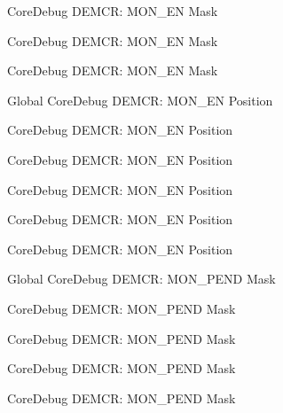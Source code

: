 \begin{DoxyRefList}
\label{deprecated__deprecated000505}%
%
Core\+Debug DEMCR\+: MON\+\_\+\+EN Mask 

\label{deprecated__deprecated000340}%
%
Core\+Debug DEMCR\+: MON\+\_\+\+EN Mask 

\label{deprecated__deprecated000198}%
%
Core\+Debug DEMCR\+: MON\+\_\+\+EN Mask  
\item[Global \doxylink{group___c_m_s_i_s___core_debug_ga802829678f6871863ae9ecf60a10425c}{Core\+Debug\+\_\+\+DEMCR\+\_\+\+MON\+\_\+\+EN\+\_\+\+Pos} ]\label{deprecated__deprecated000053}%
%
Core\+Debug DEMCR\+: MON\+\_\+\+EN Position 

\label{deprecated__deprecated000415}%
%
Core\+Debug DEMCR\+: MON\+\_\+\+EN Position 

\label{deprecated__deprecated000504}%
%
Core\+Debug DEMCR\+: MON\+\_\+\+EN Position 

\label{deprecated__deprecated000606}%
%
Core\+Debug DEMCR\+: MON\+\_\+\+EN Position 

\label{deprecated__deprecated000339}%
%
Core\+Debug DEMCR\+: MON\+\_\+\+EN Position 

\label{deprecated__deprecated000197}%
%
Core\+Debug DEMCR\+: MON\+\_\+\+EN Position  
\item[Global \doxylink{group___c_m_s_i_s___core_debug_ga68ec55930269fab78e733dcfa32392f8}{Core\+Debug\+\_\+\+DEMCR\+\_\+\+MON\+\_\+\+PEND\+\_\+\+Msk} ]\label{deprecated__deprecated000052}%
%
Core\+Debug DEMCR\+: MON\+\_\+\+PEND Mask 

\label{deprecated__deprecated000503}%
%
Core\+Debug DEMCR\+: MON\+\_\+\+PEND Mask 

\label{deprecated__deprecated000605}%
%
Core\+Debug DEMCR\+: MON\+\_\+\+PEND Mask 

\label{deprecated__deprecated000338}%
%
Core\+Debug DEMCR\+: MON\+\_\+\+PEND Mask 

\label{deprecated__deprecated000414}%
%
Core\+Debug DEMCR\+: MON\+\_\+\+PEND Mask 


\end{DoxyRefList}
